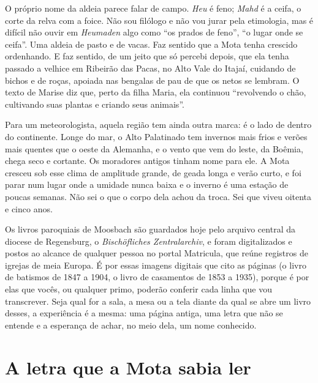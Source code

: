 \documentclass[
  brazilian,
  11pt,
  openany]{book}
\begin{document}
O próprio nome da aldeia parece falar de campo. \emph{Heu} é feno;
\emph{Mahd} é a ceifa, o corte da relva com a foice. Não sou filólogo e
não vou jurar pela etimologia, mas é difícil não ouvir em
\emph{Heumaden} algo como ``os prados de feno'', ``o lugar onde se
ceifa''. Uma aldeia de pasto e de vacas. Faz sentido que a Mota tenha
crescido ordenhando. E faz sentido, de um jeito que só percebi depois,
que ela tenha passado a velhice em Ribeirão das Pacas, no Alto Vale do
Itajaí, cuidando de bichos e de roças, apoiada nas bengalas de pau de
que os netos se lembram. O texto de Marise diz que, perto da filha
Maria, ela continuou ``revolvendo o chão, cultivando suas plantas e
criando seus animais''.

Para um meteorologista, aquela região tem ainda outra marca: é o lado de
dentro do continente. Longe do mar, o Alto Palatinado tem invernos mais
frios e verões mais quentes que o oeste da Alemanha, e o vento que vem
do leste, da Boêmia, chega seco e cortante. Os moradores antigos tinham
nome para ele. A Mota cresceu sob esse clima de amplitude grande, de
geada longa e verão curto, e foi parar num lugar onde a umidade nunca
baixa e o inverno é uma estação de poucas semanas. Não sei o que o corpo
dela achou da troca. Sei que viveu oitenta e cinco anos.

Os livros paroquiais de Moosbach são guardados hoje pelo arquivo central
da diocese de Regensburg, o \emph{Bischöfliches Zentralarchiv}, e foram
digitalizados e postos ao alcance de qualquer pessoa no portal
Matricula, que reúne registros de igrejas de meia Europa. É por essas
imagens digitais que cito as páginas (o livro de batismos de 1847 a
1904, o livro de casamentos de 1853 a 1935), porque é por elas que
vocês, ou qualquer primo, poderão conferir cada linha que vou
transcrever. Seja qual for a sala, a mesa ou a tela diante da qual se
abre um livro desses, a experiência é a mesma: uma página antiga, uma
letra que não se entende e a esperança de achar, no meio dela, um nome
conhecido.

\section{A letra que a Mota sabia
ler}\label{a-letra-que-a-mota-sabia-ler}
\end{document}
